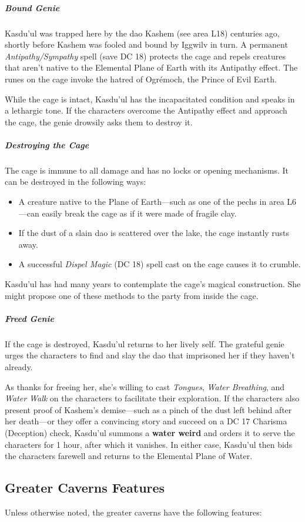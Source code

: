 \documentclass[10pt,a4paper,twoside,bg=print,twocolumn,openany,nodeprecatedcode]{dndbook}
\begin{document}
\subparagraph{Bound Genie}
Kasdu'ul was trapped here by the dao Kashem (see area L18) centuries ago, shortly before Kashem was fooled and bound by Iggwilv in turn. A permanent \textit{Antipathy/Sympathy} spell (save DC 18) protects the cage and repels creatures that aren't native to the Elemental Plane of Earth with its Antipathy effect. The runes on the cage invoke the hatred of Ogrémoch, the Prince of Evil Earth.

While the cage is intact, Kasdu'ul has the incapacitated condition and speaks in a lethargic tone. If the characters overcome the Antipathy effect and approach the cage, the genie drowsily asks them to destroy it.

\subparagraph{Destroying the Cage}
The cage is immune to all damage and has no locks or opening mechanisms. It can be destroyed in the following ways:


\begin{itemize}
\item A creature native to the Plane of Earth—such as one of the pechs in area L6—can easily break the cage as if it were made of fragile clay.
\item If the dust of a slain dao is scattered over the lake, the cage instantly rusts away.
\item A successful \textit{Dispel Magic} (DC 18) spell cast on the cage causes it to crumble.
\end{itemize}

Kasdu'ul has had many years to contemplate the cage's magical construction. She might propose one of these methods to the party from inside the cage.

\subparagraph{Freed Genie}
If the cage is destroyed, Kasdu'ul returns to her lively self. The grateful genie urges the characters to find and slay the dao that imprisoned her if they haven't already.

As thanks for freeing her, she's willing to cast \textit{Tongues}, \textit{Water Breathing}, and \textit{Water Walk} on the characters to facilitate their exploration. If the characters also present proof of Kashem's demise—such as a pinch of the dust left behind after her death—or they offer a convincing story and succeed on a DC 17 Charisma (Deception) check, Kasdu'ul summons a \textbf{water weird} and orders it to serve the characters for 1 hour, after which it vanishes. In either case, Kasdu'ul then bids the characters farewell and returns to the Elemental Plane of Water.

\subsection{Greater Caverns Features}
Unless otherwise noted, the greater caverns have the following features:
\end{document}
